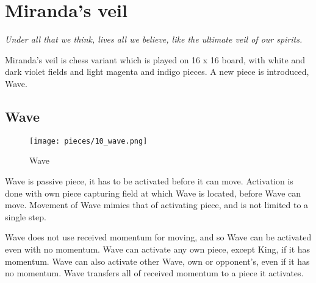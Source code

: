 

\chapter*{Miranda's veil}
\label{ch:Miranda's veil}

\begin{flushright}
\parbox{0.8\textwidth}{
\emph{Under all that we think, lives all we believe, like the ultimate veil of our spirits. \newline
{} } }
\end{flushright}

\noindent
Miranda's veil is chess variant which is played on 16 x 16 board, with
white and dark violet fields and light magenta and indigo pieces.
A new piece is introduced, Wave.

\clearpage %

\section*{Wave}
\label{sec:Miranda's veil/Wave}

\vspace*{-1.4\baselineskip}
\noindent
\begin{wrapfigure}[12]{l}{0.4\textwidth}
\centering
\texttt{[image: pieces/10\_wave.png]}
\caption{Wave}
\label{fig:10_wave}
\end{wrapfigure}
Wave is passive piece, it has to be activated before it can move. Activation is done
with own piece capturing field at which Wave is located, before Wave can move.
Movement of Wave mimics that of activating piece, and is not limited to a single
step.

Wave does not use received momentum for moving, and so Wave can be activated even
with no momentum. Wave can activate any own piece, except King, if it has momentum.
Wave can also activate other Wave, own or opponent's, even if it has no momentum.
Wave transfers all of received momentum to a piece it activates.

